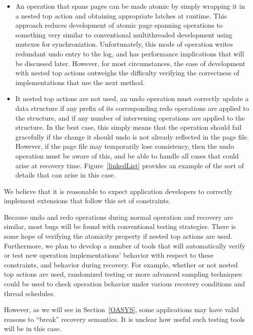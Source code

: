 \documentclass[letterpaper,twocolumn,english]{article}
\begin{document}
\begin{itemize}
\item An operation that spans pages can be made atomic by simply
wrapping it in a nested top action and obtaining appropriate latches
at runtime.  This approach reduces development of atomic page spanning
operations to something very similar to conventional multithreaded
development using mutexes for synchroniztion.  Unfortunately, this
mode of operation writes redundant undo entry to the log, and has
performance implications that will be discussed later.  However, for
most circumstances, the ease of development with nested top actions
outweighs the difficulty verifying the correctness of implementations
that use the next method.

\item It nested top actions are not used, an undo operation must
correctly update a data structure if any prefix of its corresponding
redo operations are applied to the structure, and if any number of
intervening operations are applied to the structure.  In the best
case, this simply means that the operation should fail gracefully if
the change it should undo is not already reflected in the page file.
However, if the page file may temporarily lose consistency, then the
undo operation must be aware of this, and be able to handle all cases
that could arise at recovery time.  Figure~\ref{linkedList} provides
an example of the sort of details that can arise in this case.
\end{itemize}

We believe that it is reasonable to expect application developers to
correctly implement extensions that follow this set of constraints.  

Because undo and redo operations during normal operation and recovery
are similar, most bugs will be found with conventional testing
strategies.  There is some hope of verifying the atomicity property if
nested top actions are used.  Furthermore, we plan to develop a
number of tools that will automatically verify or test new operation
implementations' behavior with respect to these constraints, and
behavior during recovery.  For example, whether or not nested top actions are
used, randomized testing or more advanced sampling techniques~\cite{OSDIFSModelChecker}
could be used to check operation behavior under various recovery
conditions and thread schedules.

However, as we will see in Section~\ref{OASYS}, some applications may
have valid reasons to ``break'' recovery semantics.  It is unclear how
useful such testing tools will be in this case.
\end{document}
